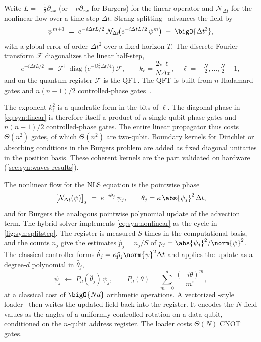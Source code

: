 Write $L=-\tfrac12\partial_{xx}$ (or $-\nu\partial_{xx}$ for Burgers) for the linear operator and $\mathcal{N}_{\Delta t}$ for the nonlinear flow over a time step $\Delta t$. Strang splitting~\cite{strang1968splitting} advances the field by
\begin{equation}\label{eq:syn:strang}
  \psi^{m+1} \;=\; e^{-i\Delta t L/2}\;\mathcal{N}_{\Delta t}\!\big(e^{-i\Delta t L/2}\,\psi^{m}\big) \;+\;\bigO{\Delta t^{3}},
\end{equation}
with a global error of order $\Delta t^{2}$ over a fixed horizon $T$. The discrete Fourier transform $\mathcal{F}$ diagonalizes the linear half-step,
\begin{equation}\label{eq:syn:linear}
  e^{-i\Delta t L/2} \;=\; \mathcal{F}^{\dagger}\,\operatorname{diag}\!\big(e^{-i k_\ell^{2}\Delta t/4}\big)\,\mathcal{F},
  \qquad k_\ell=\frac{2\pi\ell}{N\Delta x},\quad \ell=-\tfrac{N}{2},\dots,\tfrac{N}{2}-1,
\end{equation}
and on the quantum register $\mathcal{F}$ is the QFT. The QFT is built from $n$ Hadamard gates and $n(n-1)/2$ controlled-phase gates~\cite{nielsen2010qcqi}.

The exponent $k_\ell^{2}$ is a quadratic form in the bits of $\ell$. The diagonal phase in \cref{eq:syn:linear} is therefore itself a product of $n$ single-qubit phase gates and $n(n-1)/2$ controlled-phase gates. The entire linear propagator thus costs $\Theta(n^{2})$ gates, of which $\Theta(n^{2})$ are two-qubit. Boundary kernels for Dirichlet or absorbing conditions in the Burgers problem are added as fixed diagonal unitaries in the position basis. These coherent kernels are the part validated on hardware (\cref{sec:syn:waves-results}).

The nonlinear flow for the NLS equation is the pointwise phase
\begin{equation}\label{eq:syn:nonlinear}
  \big[\mathcal{N}_{\Delta t}(\psi)\big]_j \;=\; e^{-i\theta_j}\,\psi_j,\qquad \theta_j=\kappa\,\abs{\psi_j}^{2}\,\Delta t ,
\end{equation}
and for Burgers the analogous pointwise polynomial update of the advection term. The hybrid solver implements \cref{eq:syn:nonlinear} as the cycle in \cref{fig:syn:splitstep}. The register is measured $S$ times in the computational basis, and the counts $n_j$ give the estimates $\hat p_j=n_j/S$ of $p_j=\abs{\psi_j}^{2}/\norm{\psi}^{2}$. The classical controller forms $\hat\theta_j=\kappa\hat p_j\norm{\psi}^{2}\Delta t$ and applies the update as a degree-$d$ polynomial in $\hat\theta_j$,
\begin{equation}\label{eq:syn:poly}
  \psi_j \;\leftarrow\; P_d(\hat\theta_j)\,\psi_j,\qquad P_d(\theta)=\sum_{m=0}^{d}\frac{(-i\theta)^{m}}{m!},
\end{equation}
at a classical cost of $\bigO{Nd}$ arithmetic operations. A vectorized \qcrank{}-style loader~\cite{balewski2024qcrank,mottonen2004ucr} then writes the updated field back into the register. It encodes the $N$ field values as the angles of a uniformly controlled rotation on a data qubit, conditioned on the $n$-qubit address register. The loader costs $\Theta(N)$ CNOT gates.

